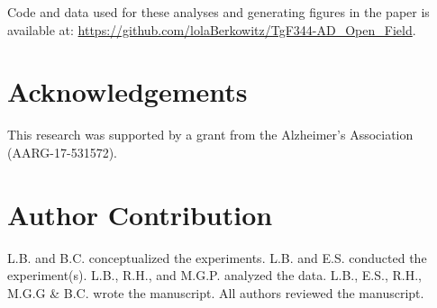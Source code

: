 \documentclass[fleqn,10pt]{wlscirep}
\begin{document}
Code and data used for these analyses and generating figures in the paper is available at: \url{https://github.com/lolaBerkowitz/TgF344-AD_Open_Field}.






\section*{Acknowledgements}
This research was supported by a grant from the Alzheimer’s Association (AARG-17-531572).

\section*{Author Contribution}
L.B. and B.C. conceptualized the experiments. L.B. and E.S. conducted the experiment(s). L.B., R.H., and M.G.P. analyzed the data. L.B., E.S., R.H., M.G.G \& B.C. wrote the manuscript. All authors reviewed the manuscript. 



\end{document}
